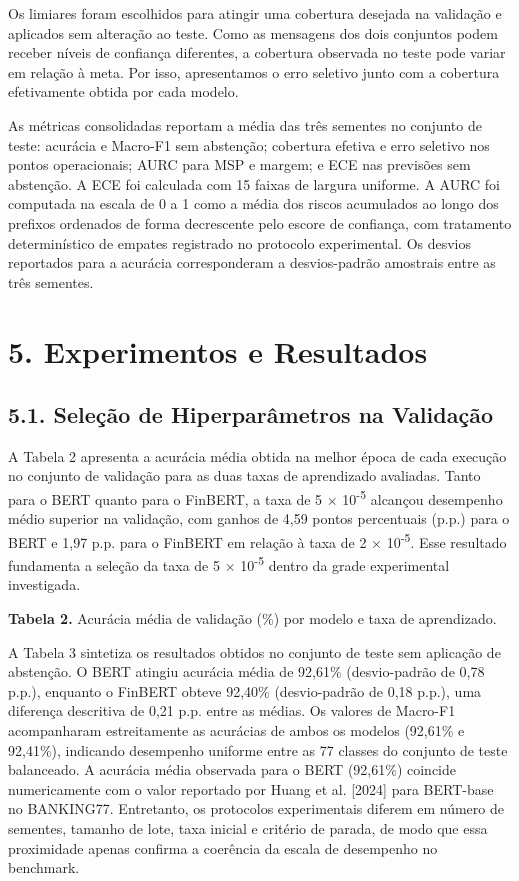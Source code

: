\documentclass[12pt,a4paper]{article}
\begin{document}
Os limiares foram escolhidos para atingir uma cobertura desejada na validação e aplicados sem alteração ao teste. Como as mensagens dos dois conjuntos podem receber níveis de confiança diferentes, a cobertura observada no teste pode variar em relação à meta. Por isso, apresentamos o erro seletivo junto com a cobertura efetivamente obtida por cada modelo.

As métricas consolidadas reportam a média das três sementes no conjunto de teste: acurácia e Macro-F1 sem abstenção; cobertura efetiva e erro seletivo nos pontos operacionais; AURC para MSP e margem; e ECE nas previsões sem abstenção. A ECE foi calculada com 15 faixas de largura uniforme. A AURC foi computada na escala de 0 a 1 como a média dos riscos acumulados ao longo dos prefixos ordenados de forma decrescente pelo escore de confiança, com tratamento determinístico de empates registrado no protocolo experimental. Os desvios reportados para a acurácia corresponderam a desvios-padrão amostrais entre as três sementes.

\section*{\textbf{5. Experimentos e Resultados}}

\subsection*{\textbf{5.1. Seleção de Hiperparâmetros na Validação}}

A Tabela 2 apresenta a acurácia média obtida na melhor época de cada execução no conjunto de validação para as duas taxas de aprendizado avaliadas. Tanto para o BERT quanto para o FinBERT, a taxa de 5 \ensuremath{\times} 10\textsuperscript{-}\textsuperscript{5} alcançou desempenho médio superior na validação, com ganhos de 4,59 pontos percentuais (p.p.) para o BERT e 1,97 p.p. para o FinBERT em relação à taxa de 2 \ensuremath{\times} 10\textsuperscript{-}\textsuperscript{5}. Esse resultado fundamenta a seleção da taxa de 5 \ensuremath{\times} 10\textsuperscript{-}\textsuperscript{5} dentro da grade experimental investigada.

\textbf{Tabela 2.} Acurácia média de validação (\%) por modelo e taxa de aprendizado.

A Tabela 3 sintetiza os resultados obtidos no conjunto de teste sem aplicação de abstenção. O BERT atingiu acurácia média de 92,61\% (desvio-padrão de 0,78 p.p.), enquanto o FinBERT obteve 92,40\% (desvio-padrão de 0,18 p.p.), uma diferença descritiva de 0,21 p.p. entre as médias. Os valores de Macro-F1 acompanharam estreitamente as acurácias de ambos os modelos (92,61\% e 92,41\%), indicando desempenho uniforme entre as 77 classes do conjunto de teste balanceado. A acurácia média observada para o BERT (92,61\%) coincide numericamente com o valor reportado por Huang et al. [2024] para BERT-base no BANKING77. Entretanto, os protocolos experimentais diferem em número de sementes, tamanho de lote, taxa inicial e critério de parada, de modo que essa proximidade apenas confirma a coerência da escala de desempenho no benchmark.
\end{document}
